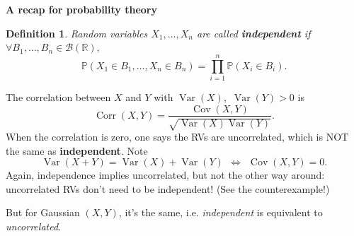 \documentclass[19pt,landscaoe]{article}
\newtheorem{defi}[thm]{Definition}
\newcommand{\IP}{\mathbb{P}}
\newcommand{\R}{\mathbb{R}}
\DeclareMathOperator{\Var}{\mathrm{Var}}
\DeclareMathOperator{\var}{\mathrm{Var}}
\DeclareMathOperator{\cov}{\mathrm{Cov}}
\DeclareMathOperator{\corr}{\mathrm{Corr}}
\begin{document}
\newpage
{\LARGE\centerline{\textbf{A recap for probability theory}}}
\vskip25pt
\begin{minipage}{.9\textwidth}
   \large
\begin{defi}
    Random variables $X_1,\dots,X_n$ are called {\bf independent} if ~$\forall B_1,\dots,B_n\in\mathcal{B}(\R),$
    $$\IP(X_1\in B_1,\dots,X_n\in B_n)=\prod_{i=1}^n\IP(X_i\in B_i).$$
\end{defi}
   The correlation between $X$ and $Y$ with $\Var(X),$ $\Var(Y)>0$ is 
   $$\corr(X,Y)=\frac{\cov(X,Y)}{\sqrt{\var(X)\var(Y)}}.$$
   When the correlation is zero, one says the RVs are uncorrelated, which is NOT the same as {\bf independent}. Note 
   $$\Var(X+Y)=\Var(X)+\Var(Y)~~\Leftrightarrow~~\cov(X,Y)=0.$$
 Again, independence implies uncorrelated, but not the other way around: uncorrelated RVs don't need to be independent! (See the counterexample!)
   
   \vskip 5pt
   But for Gaussian $(X,Y)$, it's the same, i.e. {\it independent} is equivalent to {\it uncorrelated}. 
\end{minipage}







\newpage


\end{document}
